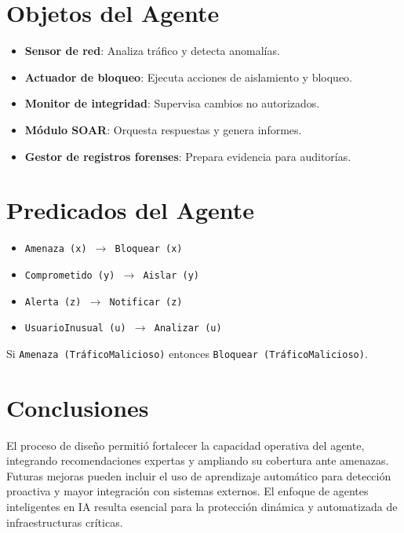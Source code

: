 \documentclass[letterpaper, 12pt]{report}
\begin{document}
\section{Objetos del Agente}

\begin{itemize}
      \item \textbf{Sensor de red}: Analiza tráfico y detecta anomalías.
      \item \textbf{Actuador de bloqueo}: Ejecuta acciones de aislamiento y bloqueo.
      \item \textbf{Monitor de integridad}: Supervisa cambios no autorizados.
      \item \textbf{Módulo SOAR}: Orquesta respuestas y genera informes.
      \item \textbf{Gestor de registros forenses}: Prepara evidencia para auditorías.
\end{itemize}

\section{Predicados del Agente}

\begin{itemize}
      \item \texttt{Amenaza (x) $\rightarrow$ Bloquear (x)}
      \item \texttt{Comprometido (y) $\rightarrow$ Aislar (y)}
      \item \texttt{Alerta (z) $\rightarrow$ Notificar (z)}
      \item \texttt{UsuarioInusual (u) $\rightarrow$ Analizar (u)}
\end{itemize}

Si \texttt{Amenaza (TráficoMalicioso)} entonces \texttt{Bloquear
      (TráficoMalicioso)}.

\section{Conclusiones}
El proceso de diseño permitió fortalecer la capacidad operativa del agente,
integrando recomendaciones expertas y ampliando su cobertura ante amenazas.
Futuras mejoras pueden incluir el uso de aprendizaje automático para detección
proactiva y mayor integración con sistemas externos. El enfoque de agentes
inteligentes en IA resulta esencial para la protección dinámica y automatizada
de infraestructuras críticas.

\printbibliography{}
\end{document}

